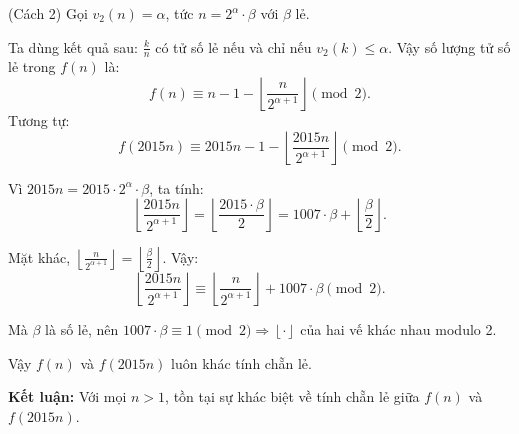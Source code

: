 \documentclass[../06-largest-exponent.tex]{subfiles}
\begin{document}

\bigbreak

\begin{soln}(Cách 2)\footnotemark
	Gọi \(v_2(n) = \alpha\), tức \( n = 2^\alpha \cdot \beta \) với \( \beta \) lẻ.

	Ta dùng kết quả sau: \( \frac{k}{n} \) có tử số lẻ nếu và chỉ nếu \( v_2(k) \le \alpha \).  
	Vậy số lượng tử số lẻ trong \(f(n)\) là:
	\[
		f(n) \equiv n - 1 - \left\lfloor \frac{n}{2^{\alpha + 1}} \right\rfloor \pmod{2}.
	\]
	Tương tự:
	\[
		f(2015n) \equiv 2015n - 1 - \left\lfloor \frac{2015n}{2^{\alpha + 1}} \right\rfloor \pmod{2}.
	\]

	Vì \(2015n = 2015 \cdot 2^\alpha \cdot \beta\), ta tính:
	\[
		\left\lfloor \frac{2015n}{2^{\alpha + 1}} \right\rfloor = \left\lfloor \frac{2015 \cdot \beta}{2} \right\rfloor = 1007 \cdot \beta + \left\lfloor \frac{\beta}{2} \right\rfloor.
	\]

	Mặt khác, \( \left\lfloor \frac{n}{2^{\alpha + 1}} \right\rfloor = \left\lfloor \frac{\beta}{2} \right\rfloor \). Vậy:
	\[
		\left\lfloor \frac{2015n}{2^{\alpha + 1}} \right\rfloor \equiv \left\lfloor \frac{n}{2^{\alpha + 1}} \right\rfloor + 1007 \cdot \beta \pmod{2}.
	\]

	Mà \( \beta \) là số lẻ, nên \( 1007 \cdot \beta \equiv 1 \pmod{2} \Rightarrow \left\lfloor \cdot \right\rfloor \) của hai vế khác nhau modulo 2.

	Vậy \(f(n)\) và \(f(2015n)\) luôn khác tính chẵn lẻ.

	\textbf{Kết luận:} Với mọi \( n > 1 \), tồn tại sự khác biệt về tính chẵn lẻ giữa \( f(n) \) và \( f(2015n) \).
\end{soln}

\end{document}
